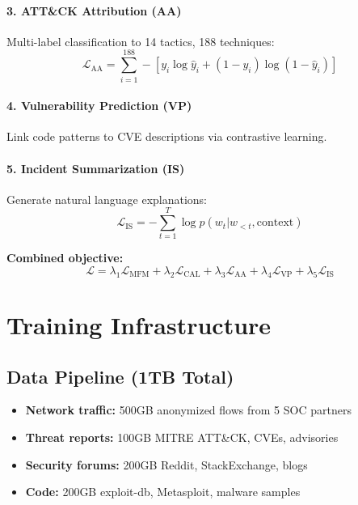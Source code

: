 \documentclass{article}
\begin{document}
\paragraph{3. ATT\&CK Attribution (AA)}
Multi-label classification to 14 tactics, 188 techniques:
\begin{equation}
\mathcal{L}_{\text{AA}} = \sum_{i=1}^{188} -[y_i \log \hat{y}_i + (1-y_i) \log(1-\hat{y}_i)]
\end{equation}

\paragraph{4. Vulnerability Prediction (VP)}
Link code patterns to CVE descriptions via contrastive learning.

\paragraph{5. Incident Summarization (IS)}
Generate natural language explanations:
\begin{equation}
\mathcal{L}_{\text{IS}} = -\sum_{t=1}^T \log p(w_t | w_{<t}, \text{context})
\end{equation}

\textbf{Combined objective:}
\begin{equation}
\mathcal{L} = \lambda_1 \mathcal{L}_{\text{MFM}} + \lambda_2 \mathcal{L}_{\text{CAL}} + \lambda_3 \mathcal{L}_{\text{AA}} + \lambda_4 \mathcal{L}_{\text{VP}} + \lambda_5 \mathcal{L}_{\text{IS}}
\end{equation}

\section{Training Infrastructure}

\subsection{Data Pipeline (1TB Total)}
\begin{itemize}
\item \textbf{Network traffic:} 500GB anonymized flows from 5 SOC partners
\item \textbf{Threat reports:} 100GB MITRE ATT\&CK, CVEs, advisories
\item \textbf{Security forums:} 200GB Reddit, StackExchange, blogs
\item \textbf{Code:} 200GB exploit-db, Metasploit, malware samples
\end{itemize}
\end{document}
